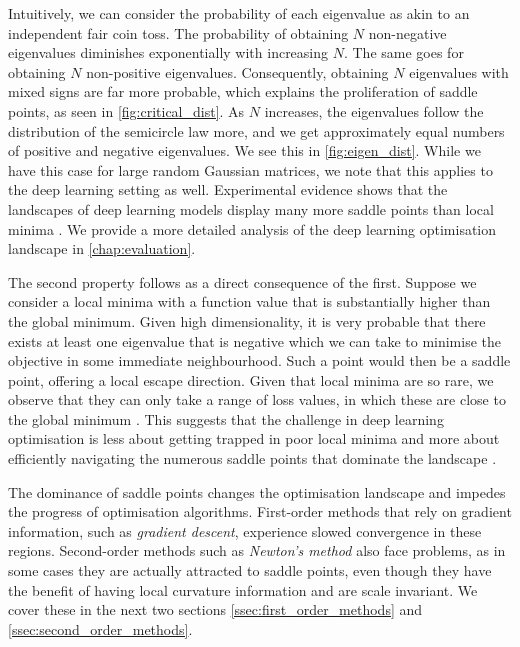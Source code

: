 Intuitively, we can consider the probability of each eigenvalue as akin to an independent fair coin toss. The probability of obtaining $N$ non-negative eigenvalues diminishes exponentially with increasing $N$. The same goes for obtaining $N$ non-positive eigenvalues. Consequently, obtaining $N$ eigenvalues with mixed signs are far more probable, which explains the proliferation of saddle points, as seen in \cref{fig:critical_dist}. As $N$ increases, the eigenvalues follow the distribution of the semicircle law more, and we get approximately equal numbers of positive and negative eigenvalues. We see this in \cref{fig:eigen_dist}. While we have this case for large random Gaussian matrices, we note that this applies to the deep learning setting as well. Experimental evidence shows that the landscapes of deep learning models display many more saddle points than local minima \citep{dauphin2014sfn}. We provide a more detailed analysis of the deep learning optimisation landscape in \cref{chap:evaluation}.

The second property follows as a direct consequence of the first. Suppose we consider a local minima with a function value that is substantially higher than the global minimum. Given high dimensionality, it is very probable that there exists at least one eigenvalue that is negative which we can take to minimise the objective in some immediate neighbourhood. Such a point would then be a saddle point, offering a local escape direction. Given that local minima are so rare, we observe that they can only take a range of loss values, in which these are close to the global minimum \citep{choromanska2015loss, dauphin2014sfn, deep_learning_book}. This suggests that the challenge in deep learning optimisation is less about getting trapped in poor local minima and more about efficiently navigating the numerous saddle points that dominate the landscape \citep{deep_learning_book}. 

The dominance of saddle points changes the optimisation landscape and impedes the progress of optimisation algorithms. First-order methods that rely on gradient information, such as \textit{gradient descent}, experience slowed convergence in these regions. Second-order methods such as \textit{Newton's method} also face problems, as in some cases they are actually attracted to saddle points, even though they have the benefit of having local curvature information and are scale invariant. We cover these in the next two sections \cref{ssec:first_order_methods} and \cref{ssec:second_order_methods}.

